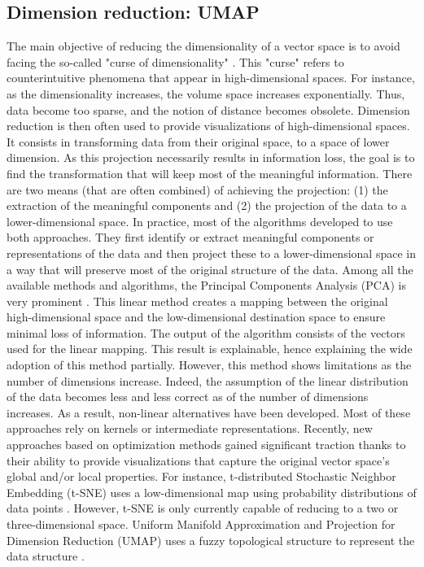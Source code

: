 \subsection{Dimension reduction: UMAP}
The main objective of reducing the dimensionality of a vector space is to avoid facing the
so-called "curse of dimensionality" \parencite{bellmanDynamicProgramming1966}.
This "curse" refers to counterintuitive phenomena that appear in high-dimensional spaces.
For instance, as the dimensionality increases, the volume space increases exponentially.
Thus, data become too sparse, and the notion of distance becomes obsolete.
Dimension reduction is then often used to provide visualizations of high-dimensional spaces.
It consists in transforming data from their original space, to a space of lower dimension.
As this projection necessarily results in information loss, the goal is to find the transformation
that will keep most of the meaningful information.
There are two means (that are often combined) of achieving the projection:
(1) the extraction of the meaningful components and
(2) the projection of the data to a lower-dimensional space.
In practice, most of the algorithms developed to use both approaches.
They first identify or extract meaningful components or representations of the data and then project these to a lower-dimensional space in a way that will preserve most of the original structure of the data.
Among all the available methods and algorithms, the Principal Components Analysis (PCA) is very prominent \parencite{hotellingAnalysisComplexStatistical1933}.
This linear method creates a mapping between the original high-dimensional space and the low-dimensional destination space to ensure minimal loss of information.
The output of the algorithm consists of the vectors used for the linear mapping.
This result is explainable, hence explaining the wide adoption of this method partially.
However, this method shows limitations as the number of dimensions increase.
Indeed, the assumption of the linear distribution of the data becomes less and less correct as of the number of dimensions increases.
As a result, non-linear alternatives have been developed.
Most of these approaches rely on kernels or intermediate representations.
Recently, new approaches based on optimization methods gained significant traction thanks to their ability to provide visualizations that capture the original vector space's global and/or local properties.
For instance, t-distributed Stochastic Neighbor Embedding (t-SNE) uses a low-dimensional
map using probability distributions of data points \parencite{maatenVisualizingDataUsing2008}.
However, t-SNE is only currently capable of reducing to a two or three-dimensional space.
Uniform Manifold Approximation and Projection for Dimension Reduction (UMAP) uses a fuzzy
topological structure to represent the data structure \parencite{mcinnesUMAPUniformManifold2020}.

